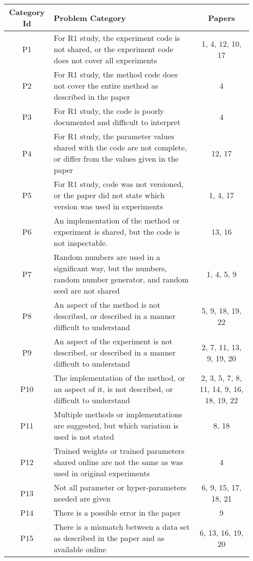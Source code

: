 \begin{tabularx}{\textwidth}{cXc}
\toprule
Category Id &                                                                                                                               Problem Category &                                    Papers \\
\midrule
 P1 &  For R1 study, the experiment code is not shared, or the experiment code does not cover all experiments &  1, 4, 12, 10, 17 \\
 P2 &  For R1 study, the method code does not cover the entire method as described in the paper &  4 \\
 P3 &  For R1 study, the code is poorly documented and difficult to interpret &  4 \\
 P4 &  For R1 study, the parameter values shared with the code are not complete, or differ from the values given in the paper &  12, 17 \\
 P5 &  For R1 study, code was not versioned, or the paper did not state which version was used in experiments &  1, 4, 17 \\
 P6 &  An implementation of the method or experiment is shared, but the code is not inspectable.  &  13, 16 \\
 P7 &  Random numbers are used in a significant way, but the numbers, random number generator, and random seed are not shared &  1, 4, 5, 9 \\
 P8 &  An aspect of the method is not described, or described in a manner difficult to understand &  5, 9, 18, 19, 22 \\
 P9 &  An aspect of the experiment is not described, or described in a manner difficult to understand &  2, 7, 11, 13, 9, 19, 20 \\
 P10 &  The implementation of the method, or an aspect of it, is not described, or difficult to understand &  2, 3, 5, 7, 8, 11, 14, 9, 16, 18, 19, 22 \\
 P11 &  Multiple methods or implementations are suggested, but which variation is used is not stated &  8, 18 \\
 P12 &  Trained weights or trained parameters shared online are not the same as was used in original experiments &  4 \\
 P13 &  Not all parameter or hyper-parameters needed are given &  6, 9, 15, 17, 18, 21 \\
 P14 &  There is a possible error in the paper &  9 \\
 P15 &  There is a mismatch between a data set as described in the paper and as available online &  6, 13, 16, 19, 20 \\

\end{tabularx}
